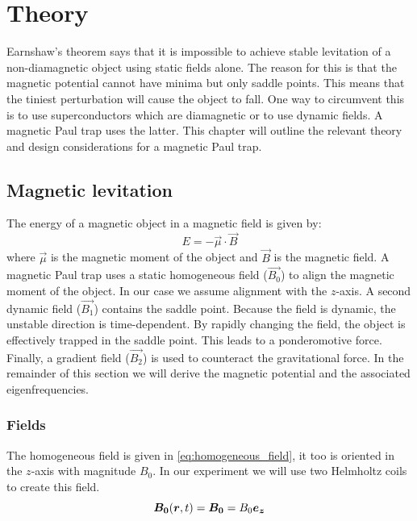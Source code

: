 \chapter{Theory}
\label{chap:theory}
Earnshaw's theorem says that it is impossible to achieve stable levitation of a non-diamagnetic object using static fields alone. The reason for this is that the magnetic potential cannot have minima but only saddle points. This means that the tiniest perturbation will cause the object to fall. One way to circumvent this is to use superconductors which are diamagnetic or to use dynamic fields. A magnetic Paul trap uses the latter. This chapter will outline the relevant theory and design considerations for a magnetic Paul trap.

\section{Magnetic levitation}
\label{sec:magnetic_levitation}
The energy of a magnetic object in a magnetic field is given by:
\begin{equation}
    E = -\vec{\mu} \cdot \vec{B}
    \tag{magnetic potential}
    \label{eq:magnetic_potential_definition}
\end{equation}
where $\vec{\mu}$ is the magnetic moment of the object and $\vec{B}$ is the magnetic field. A magnetic Paul trap uses a static homogeneous field ($\vec{B_0}$) to align the magnetic moment of the object. In our case we assume alignment with the $z$-axis. A second dynamic field ($\vec{B_1}$) contains the saddle point. Because the field is dynamic, the unstable direction is time-dependent. By rapidly changing the field, the object is effectively trapped in the saddle point. This leads to a ponderomotive force\cite{perdriat}. Finally, a gradient field ($\vec{B_2}$) is used to counteract the gravitational force\cite{perdriat}. In the remainder of this section we will derive the magnetic potential and the associated eigenfrequencies.

\subsection{Fields}
\label{subsec:fields}
The homogeneous field is given in \autoref{eq:homogeneous_field}, it too is oriented in the $z$-axis with magnitude $B_0$. In our experiment we will use two Helmholtz coils to create this field.
\begin{equation}
    \bm{B_0}(\bm{r}, t) = \bm{B_0} = B_0 \bm{e_z}
    \label{eq:homogeneous_field}
\end{equation}

